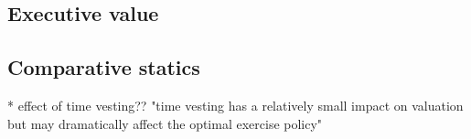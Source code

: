 \subsection{Executive value}







\subsection{Comparative statics}





* effect of time vesting?? "time vesting has a relatively small impact on valuation but may dramatically affect the optimal exercise policy" \cite{dybvig2003employee}
